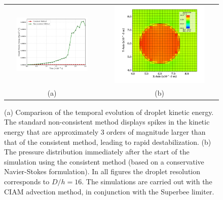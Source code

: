\begin{figure}
\begin{center}
\begin{tabular}{cc}
\hspace*{-1.0cm}
\includegraphics[width=0.8\textwidth]{plots/raindrop/ke_compare.png} &
\hspace{-0.4cm}%
\includegraphics[width=0.8\textwidth]{plots/raindrop/mc_16ppd_pressure.png}\\
\hspace{-0.8cm}%
(a) & (b)
\end{tabular}
\end{center}
\caption{ (a) Comparison of the temporal evolution of droplet kinetic energy. 
The standard non-consistent method displays spikes in the kinetic energy that are 
approximately 3 orders of magnitude larger than that of the consistent method, 
leading to rapid destabilization. 
(b) The pressure distribution immediately after the start of the simulation 
using the consistent method (based on a conservative Navier-Stokes formulation). 
In all figures the droplet resolution corresponds to $D/h = 16$.
The simulations are carried out with the CIAM advection method, in conjunction with the Superbee limiter.}
\label{pressure_2}
\end{figure}

